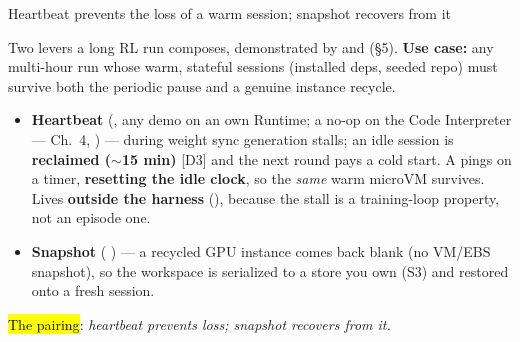 \begin{frame}{Heartbeat prevents the loss of a warm session; snapshot recovers from it}
{\footnotesize Two levers a long RL run composes, demonstrated by  and   (\S5). \textbf{Use case:} any multi-hour run whose warm, stateful sessions (installed deps, seeded repo) must survive both the periodic pause and a genuine instance recycle.\par}
\vspace{2mm}
\begin{itemize}\footnotesize\setlength{\itemsep}{2mm}
\item \textbf{Heartbeat} (, any demo on an own Runtime; a no-op on the Code Interpreter --- Ch.\ 4, ) --- during weight sync generation stalls; an idle session is \textbf{reclaimed ($\sim$15 min)} [D3] and the next round pays a cold start. A  pings on a timer, \textbf{resetting the idle clock}, so the \emph{same} warm microVM survives. Lives \textbf{outside the harness} (), because the stall is a training-loop property, not an episode one.
\item \textbf{Snapshot} ( ) --- a recycled GPU instance comes back blank (no VM/EBS snapshot), so the workspace is serialized to a store you own (S3) and restored onto a fresh session.
\end{itemize}
\vspace{2mm}
{\small\raggedright\hl{The pairing}: \emph{heartbeat prevents loss; snapshot recovers from it.}\par}
\end{frame}


